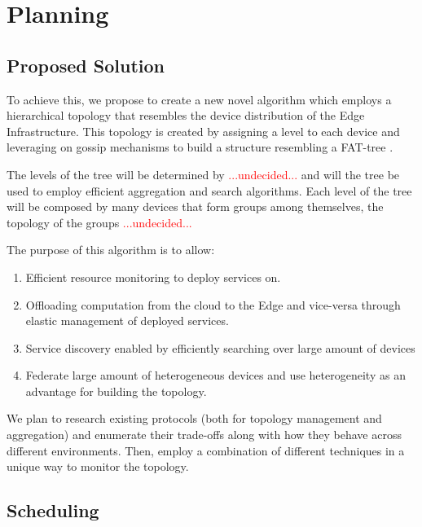 \chapter{Planning}
\label{cha:planning}

\section{Proposed Solution}
\label{cha:proposed_sol}

To achieve this, we propose to create a new novel algorithm which employs a hierarchical topology that resembles the device distribution of the Edge Infrastructure. This topology is created by assigning a level to each device and leveraging on gossip mechanisms to build a structure resembling a FAT-tree \cite{}.

The levels of the tree will be determined by \textcolor{red}{...undecided...} and will the tree be used to employ efficient aggregation and search algorithms. Each level of the tree will be composed by many devices that form groups among themselves, the topology of the groups \textcolor{red}{...undecided...} 

The purpose of this algorithm is to allow:

\begin{enumerate} 
    \item Efficient resource monitoring to deploy services on.
    \item Offloading computation from the cloud to the Edge and vice-versa through elastic management of deployed services.
    \item Service discovery enabled by efficiently searching over large amount of devices
    \item Federate large amount of heterogeneous devices and use heterogeneity as an advantage for building the topology.
\end{enumerate}

We plan to research existing protocols (both for topology management and aggregation) and enumerate their trade-offs along with how they behave across different environments. Then, employ a combination of different techniques in a unique way to monitor the topology.


\section{Scheduling}
